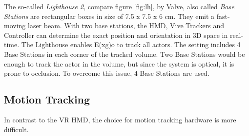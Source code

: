 The so-called \textit{Lighthouse 2}, compare figure \ref{fig:lh}, by Valve, also called \textit{Base Stations} are rectangular boxes in size of 7.5 x 7.5 x 6 cm. They emit a fast-moving laser beam. With two base stations, the HMD, Vive Trackers and Controller can determine the exact position and orientation in 3D space in real-time. The Lighthouse enables E(x\textbar g)o to track all actors. The setting includes 4 Base Stations in each corner of the tracked volume. Two Base Stations would be enough to track the actor in the volume, but since the system is optical, it is prone to occlusion. To overcome this issue, 4 Base Stations are used. 



\subsection{Motion Tracking}
In contrast to the VR HMD, the choice for motion tracking hardware is more difficult.\\

